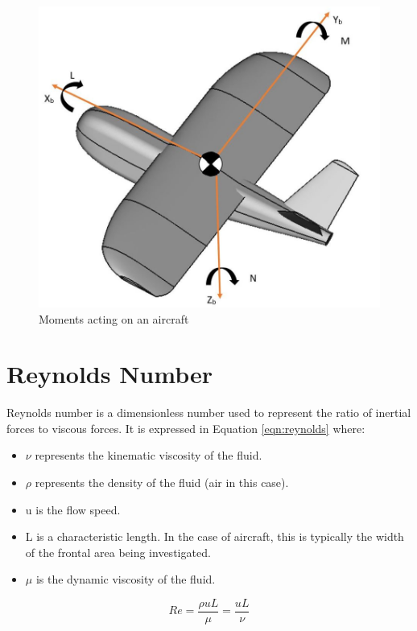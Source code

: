 \begin{figure}[H]
  \centering
   \includegraphics[width=0.8\linewidth]{03_LiteratureReview/Figs/axes2.JPG}
  \caption{Moments acting on an aircraft}
  \label{fig:pitch}
\end{figure}




\section{Reynolds Number}
Reynolds number is a dimensionless number used to represent the ratio of inertial forces to viscous forces. It is expressed in Equation \ref{eqn:reynolds} where:

\begin{itemize}
    \item $\nu$ represents the kinematic viscosity of the fluid.
    \item $\rho$ represents the density of the fluid (air in this case).
    \item u is the flow speed.
    \item L is a characteristic length. In the case of aircraft, this is typically the width of the frontal area being investigated.
    \item $\mu$ is the dynamic viscosity of the fluid.
\end{itemize} 

\begin{equation}
    Re = \frac{\rho uL}{\mu} = \frac{uL}{\nu}
    \label{eqn:reynolds}
\end{equation}

